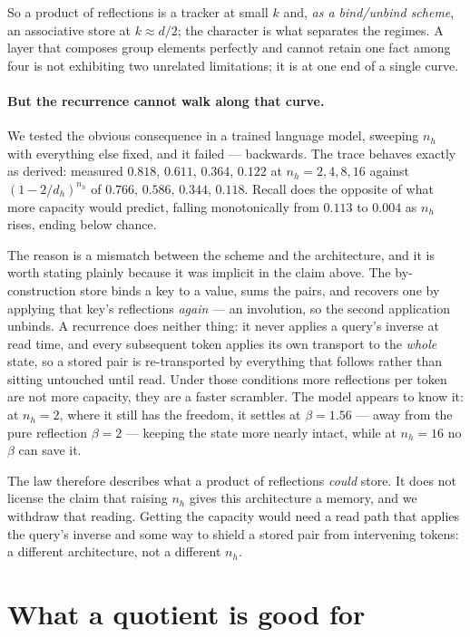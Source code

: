 \documentclass[10pt]{article}
\begin{document}
So a product of reflections is a tracker at small $k$ and, \emph{as a bind/unbind scheme}, an
associative store at $k\approx d/2$; the character is what separates the regimes. A layer that
composes group elements perfectly and cannot retain one fact among four is not exhibiting two
unrelated limitations; it is at one end of a single curve.

\paragraph{But the recurrence cannot walk along that curve.} We tested the obvious consequence in a
trained language model, sweeping $n_h$ with everything else fixed, and it failed --- backwards. The
trace behaves exactly as derived: measured $0.818$, $0.611$, $0.364$, $0.122$ at $n_h=2,4,8,16$
against $(1-2/d_h)^{n_h}$ of $0.766$, $0.586$, $0.344$, $0.118$. Recall does the opposite of what
more capacity would predict, falling monotonically from $0.113$ to $0.004$ as $n_h$ rises, ending
below chance.

The reason is a mismatch between the scheme and the architecture, and it is worth stating plainly
because it was implicit in the claim above. The by-construction store binds a key to a value, sums
the pairs, and recovers one by applying that key's reflections \emph{again} --- an involution, so
the second application unbinds. A recurrence does neither thing: it never applies a query's inverse
at read time, and every subsequent token applies its own transport to the \emph{whole} state, so a
stored pair is re-transported by everything that follows rather than sitting untouched until read.
Under those conditions more reflections per token are not more capacity, they are a faster
scrambler. The model appears to know it: at $n_h=2$, where it still has the freedom, it settles at
$\beta=1.56$ --- away from the pure reflection $\beta=2$ --- keeping the state more nearly intact,
while at $n_h=16$ no $\beta$ can save it.

The law therefore describes what a product of reflections \emph{could} store. It does not license
the claim that raising $n_h$ gives this architecture a memory, and we withdraw that reading. Getting
the capacity would need a read path that applies the query's inverse and some way to shield a stored
pair from intervening tokens: a different architecture, not a different $n_h$.

\section{What a quotient is good for}
\label{sec:quotient}
\end{document}
